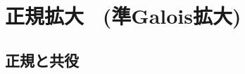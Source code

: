 \documentclass[../master_galois_theory]{subfiles}
\begin{document}
\setcounter{section}{10}

\section{正規拡大 \  (準Galois拡大)}

\subsection{正規と共役}
\end{document}
